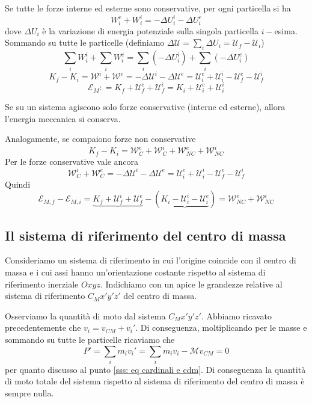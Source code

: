 \documentclass{article}
\theoremstyle{plain}
\begin{document}
Se tutte le forze interne ed esterne sono conservative, per ogni particella si ha
\[W^e_i+ W^i_i =-\Delta U_i^i -\Delta U_i^e\]
dove $\Delta U_i$ è la variazione di energia potenziale sulla singola particella $i-$esima. Sommando su tutte le particelle (definiamo $\scriptstyle \Delta \mathcal U = \sum_i\Delta U_i= \mathcal U_f-\mathcal U_i$)
\[\sum_iW_i^i +\sum_iW_i^e = \sum_i( -\Delta U_i^i) + \sum_i( -\Delta U_i^e)\]
\[K_f - K_i =\mathcal W^i +\mathcal W^e = -\Delta \mathcal U^i - \Delta \mathcal U^e = \mathcal U_i^e +\mathcal U_i^i - \mathcal U_f^e-\mathcal U_f^i\]
\[\mathcal{E}_M: = K_f +\mathcal U_f^e +\mathcal U_f^i = K_i +\mathcal U_i^e +\mathcal U_i^i\]
\begin{shadedTheorem}
    Se su un sistema agiscono solo forze conservative (interne ed esterne), allora l'energia meccanica si conserva.
\end{shadedTheorem}
Analogamente, se compaiono forze non conservative
\[K_f - K_i = \mathcal W^e_{C} + \mathcal W^i_C + \mathcal W^e_{NC} + \mathcal W^i_{NC}\]
Per le forze conservative vale ancora 
\[\mathcal W^i_C +\mathcal W^e_C = -\Delta \mathcal U^i - \Delta \mathcal U^e = \mathcal U_i^e +\mathcal U_i^i - \mathcal U_f^e-\mathcal U_f^i\]
Quindi
\[\mathcal{E}_{M,f} -\mathcal{E}_{M,i} =\underbrace{K_f +\mathcal U_f^i + \mathcal U_f^e} - \left( \underbrace{K_i -\mathcal U_i^i -\mathcal U_i^e} \right) = \mathcal W_{NC}^e +\mathcal W_{NC}^i\]
\subsection{Il sistema di riferimento del centro di massa}
Consideriamo un sistema di riferimento in cui l'origine coincide con il centro di massa e i cui assi hanno un'orientazione costante rispetto al sistema di riferimento inerziale $Oxyz$. Indichiamo con un apice le grandezze relative al sistema di riferimento $C_Mx'y'z'$ del centro di massa.

Osserviamo la quantità di moto dal sistema $C_Mx'y'z'$. Abbiamo ricavato precedentemente che $v_i=v_{CM}+v_i'$. Di conseguenza, moltiplicando per le masse e sommando su tutte le particelle ricaviamo che 
\[P' =\sum_im_iv_i' = \sum_im_iv_i - \mathcal M v_{CM} = 0 \]
per quanto discusso al punto \ref{sss: eq cardinali e cdm}. Di conseguenza la quantità di moto totale del sistema rispetto al sistema di riferimento del centro di massa è sempre nulla.
\end{document}
